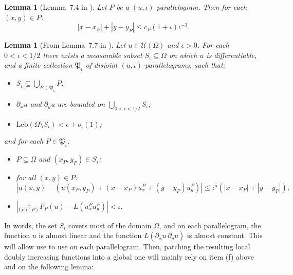 \documentclass{article}
\newtheorem{lem}[theorem]{Lemma}
\theoremstyle{remark}
\newcommand{\card}[1]{\left|#1\right|}
\def\Leb{\mathrm{Leb}}
\def\Usjo{\mathcal{U}}
\def\Psjo{\mathfrak{P}}
\begin{document}
\begin{lem}[Lemma~7.4 in \cite{S23}]\label{lem: Sjo simple bounds inside parallelogram}
    Let $P$ be a $(u,\iota)$-parallelogram.
    Then for each $(x,y)\in P$:
    \[
        \card{x-x_P} + \card{y-y_P} \le c_P (1+\iota) \iota^{-3} .
    \]
\end{lem}

\begin{lem}[From Lemma~7.7 in \cite{S23}]\label{lem: Sjo nice covering}
    Let $u\in\Usjo(\Omega)$ and $\epsilon>0$.
    For each $0<\iota<1/2$ there exists a measurable subset $S_\iota \subseteq \Omega$ on which $u$ is differentiable, and a finite collection $\Psjo_\iota$ of disjoint $(u,\iota)$-parallelograms, such that:
    \begin{itemize}
        \item[(a)] $S_\iota \subseteq \bigcup_{P\in\Psjo_\iota} P$;
        \item[(b)] $\partial_x u$ and $\partial_y u$ are bounded on $\bigcup_{0<\iota<1/2} S_\iota$;
        \item[(c)] $\Leb( \Omega \setminus S_\iota ) < \epsilon + o_\iota(1)$;
    \end{itemize}
    and for each $P\in\Psjo_\iota$:
    \begin{itemize}
        \item[(a')] $P\subseteq\Omega$ and $(x_P,y_P)\in S_\iota$;%
        \item[(f)] for all $(x,y)\in P$:
        \[
            \card{u(x,y) - \left( u(x_P,y_P) + (x-x_P)u_x^P + (y-y_P)u_y^P \right)} \le \iota^5\left( \card{x-x_P} + \card{y-y_P} \right) ;
        \]
        \item[(g)] $\card{ \frac{1}{\Leb(P)} 
        F_P(u)
        - L(u_x^P u_y^P) } < \iota$.
    \end{itemize}
\end{lem}

In words, the set $S_\iota$ covers most of the domain $\Omega$, and on each parallelogram, the function $u$ is almost linear and the function $L(\partial_x u \, \partial_y u)$ is almost constant.
This will allow use to use  on each parallelogram.
Then, patching the resulting local doubly increasing functions into a global one will mainly rely on item (f) above and on the following lemma:
\end{document}

